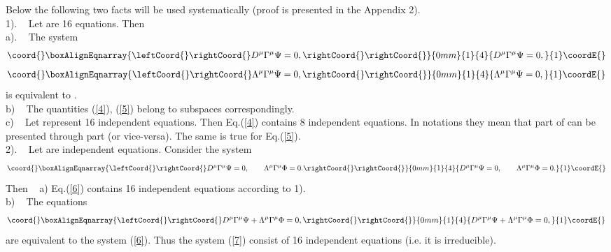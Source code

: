 \documentclass[a4paper]{article}
\begin{document}
Below the following two facts will be used systematically (proof is 
presented in the Appendix 2). \\
1). ~ Let \coordHE{} are 16 equations. Then \\
a). ~ The system 
\begin{eqnarray}\coord{}\boxAlignEqnarray{\leftCoord{}\rightCoord{}\label{4}
D^\mu\Gamma^\mu\Psi=0, \rightCoord{}
\rightCoord{}}{0mm}{1}{4}{D^\mu\Gamma^\mu\Psi=0, 
}{1}\coordE{}\end{eqnarray}
\begin{eqnarray}\coord{}\boxAlignEqnarray{\leftCoord{}\rightCoord{}\label{5}
\Lambda^\mu\Gamma^\mu\Psi=0, \rightCoord{}
\rightCoord{}}{0mm}{1}{4}{\Lambda^\mu\Gamma^\mu\Psi=0, 
}{1}\coordE{}\end{eqnarray}
is equivalent to \coordHE{}. \\
b) ~ The quantities (\ref{4}), (\ref{5}) belong to \coordHE{} 
subspaces correspondingly. \\
c) ~ Let \coordHE{} represent 16 independent equations. Then 
Eq.(\ref{4}) contains 8 independent equations. In \coordHE{} notations 
they mean that \coordHE{} part \coordHE{} of \myHighlight{$\Psi^\alpha$}\coordHE{} can be 
presented through \coordHE{} part \coordHE{} (or vice-versa). The same is 
true for Eq.(\ref{5}). \\
2). ~ Let \coordHE{} are \coordHE{} independent 
equations. Consider the system 
\begin{eqnarray}\coord{}\boxAlignEqnarray{\leftCoord{}\rightCoord{}\label{6}
D^\mu\Gamma^\mu\Psi=0, \qquad
\Lambda^\mu\Gamma^\mu\Phi=0. \rightCoord{}
\rightCoord{}}{0mm}{1}{4}{D^\mu\Gamma^\mu\Psi=0, \qquad
\Lambda^\mu\Gamma^\mu\Phi=0. 
}{1}\coordE{}\end{eqnarray}
Then ~ a) Eq.(\ref{6}) contains 16 independent equations according 
to 1). \\
b) ~ The equations 
\begin{eqnarray}\coord{}\boxAlignEqnarray{\leftCoord{}\rightCoord{}\label{7}
D^\mu\Gamma^\mu\Psi+\Lambda^\mu\Gamma^\mu\Phi=0, \rightCoord{}
\rightCoord{}}{0mm}{1}{4}{D^\mu\Gamma^\mu\Psi+\Lambda^\mu\Gamma^\mu\Phi=0, 
}{1}\coordE{}\end{eqnarray}
are equivalent to the system (\ref{6}). Thus the system (\ref{7}) 
consist of 16 independent equations (i.e. it is irreducible). 
\end{document}
